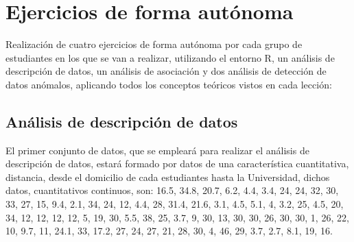 \documentclass[a4paper, 12pt]{article}
\begin{document}
	\section{Ejercicios de forma autónoma}
	Realización de cuatro ejercicios de forma autónoma por cada grupo de estudiantes en los que se van a realizar, utilizando el entorno R, un análisis de descripción de datos, un análisis de asociación y dos análisis de detección de datos anómalos, aplicando todos los conceptos teóricos vistos en cada lección:
	
	\subsection{Análisis de descripción de datos}
	El primer conjunto de datos, que se empleará para realizar el análisis de descripción de datos, estará formado por datos de una característica cuantitativa, distancia, desde el domicilio de cada estudiantes hasta la Universidad, dichos datos, cuantitativos continuos, son: 16.5, 34.8, 20.7, 6.2, 4.4, 3.4, 24, 24, 32, 30, 33, 27, 15, 9.4, 2.1, 34, 24, 12, 4.4, 28, 31.4, 21.6, 3.1, 4.5, 5.1, 4, 3.2, 25, 4.5, 20, 34, 12, 12, 12, 12, 5, 19, 30, 5.5, 38, 25, 3.7, 9, 30, 13, 30, 30, 26, 30, 30, 1, 26, 22, 10, 9.7, 11, 24.1, 33, 17.2, 27, 24, 27, 21, 28, 30, 4, 46, 29, 3.7, 2.7, 8.1, 19, 16.
\end{document}
